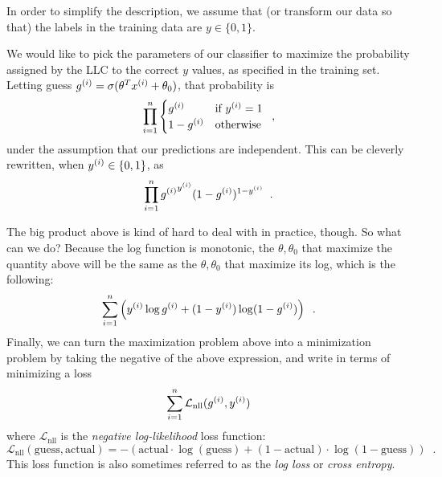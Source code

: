 In order to simplify the description, we assume that (or transform our
data so that) the labels
in the training data are $y \in \{0, 1\}$.

We would like to pick the parameters of our classifier to maximize the
probability assigned by the LLC to the correct $y$ values, as
specified in the training set.  Letting guess $g^{(i)} =
  \sigma(\theta^Tx^{(i)} + \theta_0)$,
that probability is
\begin{equation*}
  \prod_{i = 1}^n \begin{cases} g^{(i)} & \text{if $y^{(i)} =
              1$}                               \\ 1 - g^{(i)} & \text{otherwise}
  \end{cases}\;\;,
\end{equation*}
under the assumption that our predictions are independent.  This can
be cleverly rewritten, when $y^{(i)} \in \{0, 1\}$, as
\begin{equation*}
  \prod_{i = 1}^n {g^{(i)}}^{y^{(i)}}(1 - g^{(i)})^{1 - y^{(i)}}\;\;.
\end{equation*}

The big product above is kind of hard to deal with in practice, though.
So what can we do?
Because the
log function is monotonic, the $\theta, \theta_0$ that maximize the
quantity above will be the same as the $\theta, \theta_0$ that
maximize its log, which is the following:
\begin{equation*}
  \sum_{i = 1}^n  \left( {y^{(i)}}\log {g^{(i)}} +
  (1 - y^{(i)})\log(1 - g^{(i)})\right)\;\;.
\end{equation*}
Finally, we can turn the maximization problem above into a minimization problem by taking the negative
of the above expression, and write in terms of minimizing a loss
\begin{equation*}
  \sum_{i = 1}^n \mathcal{L}_\text{nll}(g^{(i)}, y^{(i)})
\end{equation*}
where $\mathcal{L}_\text{nll}$ is the {\em negative log-likelihood}
loss function:
\begin{equation*}
  \mathcal{L}_\text{nll}(\text{guess},\text{actual}) =
  -\left(\text{actual}\cdot \log (\text{guess}) + (1 - \text{actual})\cdot\log (1 -
  \text{guess})\right) \;\;.
\end{equation*}
This loss function is also sometimes referred to as the {\em log loss}
or {\em cross entropy}. 

